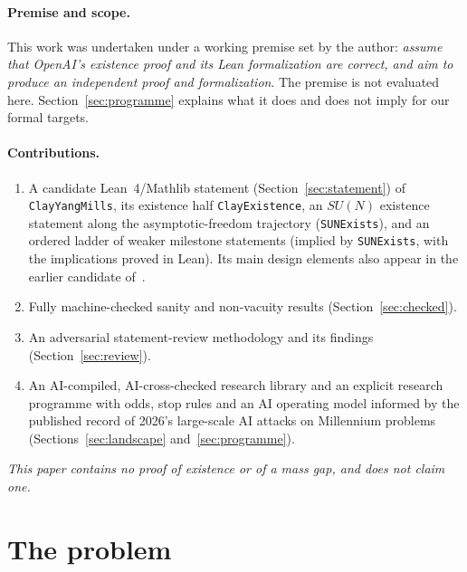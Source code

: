 \documentclass[11pt]{article}
\theoremstyle{definition}
\theoremstyle{remark}
\newcommand{\lean}[1]{\texttt{\hyphenchar\font=-1\relax #1}}
\begin{document}
\paragraph{Premise and scope.}
This work was undertaken under a working premise set by the author: \emph{assume that OpenAI's
existence proof and its Lean formalization are correct, and aim to produce an independent proof
and formalization}. The premise is not evaluated here. Section~\ref{sec:programme} explains what
it does and does not imply for our formal targets.

\paragraph{Contributions.}
\begin{enumerate}[leftmargin=*]
\item A candidate Lean~4/Mathlib statement (Section~\ref{sec:statement}) of
  \lean{ClayYangMills}, its existence half \lean{ClayExistence}, an $SU(N)$ existence statement
  along the asymptotic-freedom trajectory (\lean{SUNExists}), and an ordered ladder of weaker
  milestone statements (implied by \lean{SUNExists}, with the implications proved in Lean). Its main
  design elements also appear in the earlier candidate of~\cite{Remondiere2026}.
\item Fully machine-checked sanity and non-vacuity results (Section~\ref{sec:checked}).
\item An adversarial statement-review methodology and its findings (Section~\ref{sec:review}).
\item An AI-compiled, AI-cross-checked research library and an explicit research programme with odds, stop rules and
  an AI operating model informed by the published record of 2026's large-scale AI attacks on
  Millennium problems (Sections~\ref{sec:landscape} and~\ref{sec:programme}).
\end{enumerate}
\emph{This paper contains no proof of existence or of a mass gap, and does not claim one.}

\section{The problem}\label{sec:problem}
\end{document}
